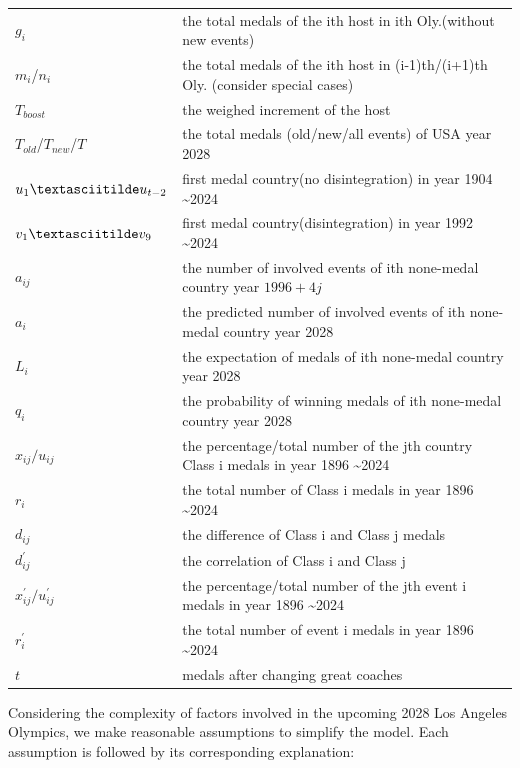 \documentclass{mcmthesis}  %
\begin{document}
\begin{table}[H]
\begin{tabular}{ll}
$g_{i}$ & the total medals of the ith host in ith Oly.(without new events) \\
$m_i$/$n_i$ & the total medals of the ith host in (i-1)th/(i+1)th Oly. (consider special cases) \\
$T_{boost}$ & the weighed increment of the host \\
$T_{old}$/$T_{new}$/$T$ & the total medals (old/new/all events) of USA year 2028 \\
$u_1 \textasciitilde u_{t-2}$ & first medal country(no disintegration) in year 1904 \textasciitilde 2024 \\
$v_1 \textasciitilde v_9$ & first medal country(disintegration) in year 1992 \textasciitilde 2024 \\

$a_{ij}$ & the number of involved events of ith none-medal country year $1996+4j$ \\

$a_{i}$ & the predicted number of involved events of ith none-medal country year 2028 \\
$L_{i}$ & the expectation of medals of ith none-medal country year 2028 \\
$q_{i}$ & the probability of winning medals of ith none-medal country year 2028 \\

$x_{ij}/u_{ij}$ & the percentage/total number of the jth country Class i medals in year 1896 \textasciitilde 2024 \\
$r_i$ & the total number of Class i medals in year 1896 \textasciitilde 2024 \\

$d_{ij}$ & the difference of Class i and Class j medals \\
$d_{ij}^{'}$ & the correlation of Class i and Class j \\

$x_{ij}^{'}/u_{ij}^{'}$ & the percentage/total number of the jth event i medals in year 1896 \textasciitilde 2024 \\
$r_i^{'}$ & the total number of event i medals in year 1896 \textasciitilde 2024 \\
$t$ & medals after changing great coaches \\
\bottomrule %
\end{tabular}
\end{table}

Considering the complexity of factors involved in the upcoming 2028 Los Angeles Olympics, we make reasonable assumptions to simplify the model. Each assumption is followed by its corresponding explanation:
\end{document}
